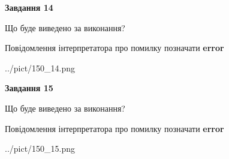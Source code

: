 \documentclass[11pt, ukrainian]{article}
\begin{document}
{\begin {large}
{\begin {center}\textbf{Завдання 14}\end {center}}\par
Що буде виведено за виконання? \par
Повідомлення інтерпретатора про помилку позначати \textbf{error}

\begin{center}
	{../pict/150_14.png}
\end{center}
\newpage

{\begin {center}\textbf{Завдання 15}\end {center}}\par
Що буде виведено за виконання? \par
Повідомлення інтерпретатора про помилку позначати \textbf{error}

\begin{center}
	{../pict/150_15.png}
\end{center}
\newpage

\end {large}}
\end{document}
